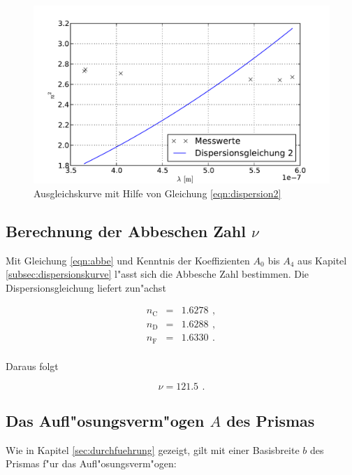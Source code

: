 		\begin{figure}[h]
			\centering
			\includegraphics[width = 15cm]{img/dispersion2.pdf}
			\caption{Ausgleichskurve mit Hilfe von Gleichung \eqref{eqn:dispersion2} \label{fig:dispersion2}}
		\end{figure}

	\clearpage

	\subsection{Berechnung der Abbeschen Zahl $\nu$}
	\label{subsec:abbe}
		Mit Gleichung \eqref{eqn:abbe} und Kenntnis der Koeffizienten $A_0$ bis $A_4$ aus Kapitel \ref{subsec:dispersionskurve} l"asst sich die Abbesche Zahl bestimmen.
		Die Dispersionsgleichung liefert zun"achst

		\begin{eqnarray*}
			n_\mathrm{C} & = & \SI{1.6278}{} \,, \\
			n_\mathrm{D} & = & \SI{1.6288}{} \,, \\
			n_\mathrm{F} & = & \SI{1.6330}{} \,. \\
		\end{eqnarray*}

		Daraus folgt

		\begin{equation*}
			\nu = \SI{121.5}{} \,.
		\end{equation*}

	\subsection{Das Aufl"osungsverm"ogen $A$ des Prismas}
	\label{subsec:aufloesungsvermoegen}
		Wie in Kapitel \ref{sec:durchfuehrung} gezeigt, gilt mit einer Basisbreite $b$ des Prismas f"ur das Aufl"osungsverm"ogen:

